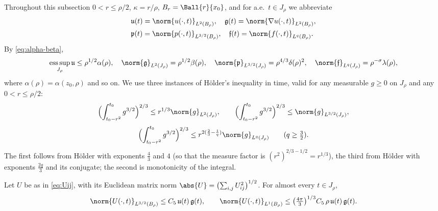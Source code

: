\documentclass[11pt,reqno]{amsart}
\begin{document}
Throughout this subsection $0<r\le\rho/2$, $\kappa=r/\rho$, $B_{r}=\Ball{r}{x_{0}}$,
and for a.e.\ $t\in J_{\rho}$ we abbreviate
\begin{equation}\label{eq:slice-norms}
\begin{aligned}
  &\mathfrak{u}(t)=\norm{u(\cdot,t)}_{L^{2}(B_{\rho})},\quad
  \mathfrak{g}(t)=\norm{\nabla u(\cdot,t)}_{L^{2}(B_{\rho})},\\
  &\mathfrak{p}(t)=\norm{p(\cdot,t)}_{L^{3/2}(B_{\rho})},\quad
  \mathfrak{f}(t)=\norm{f(\cdot,t)}_{L^{q}(B_{\rho})}.
\end{aligned}
\end{equation}
By \eqref{eq:alpha-beta},
\begin{equation}\label{eq:slice-norm-bounds}
  \operatorname*{ess\,sup}_{J_{\rho}}\mathfrak{u}\le\rho^{1/2}\alpha(\rho),
  \quad
  \norm{\mathfrak{g}}_{L^{2}(J_{\rho})}=\rho^{1/2}\beta(\rho),
  \quad
  \norm{\mathfrak{p}}_{L^{3/2}(J_{\rho})}=\rho^{4/3}\delta(\rho)^{2},
  \quad
  \norm{\mathfrak{f}}_{L^{q}(J_{\rho})}=\rho^{-\sigma}\lambda(\rho),
\end{equation}
where $\alpha(\rho)=\alpha(z_{0},\rho)$ and so on. We use three instances of
H\"older's inequality in time, valid for any measurable $g\ge0$ on $J_{\rho}$
and any $0<r\le\rho/2$:
\begin{equation}\label{eq:time-holder}
  \Bigl(\int_{t_{0}-r^{2}}^{t_{0}}g^{3/2}\Bigr)^{2/3}
  \le r^{1/3}\norm{g}_{L^{2}(J_{\rho})},
  \qquad
  \Bigl(\int_{t_{0}-r^{2}}^{t_{0}}g^{3/2}\Bigr)^{2/3}
  \le \norm{g}_{L^{3/2}(J_{\rho})},
\end{equation}
\begin{equation}\label{eq:time-holder-q}
  \Bigl(\int_{t_{0}-r^{2}}^{t_{0}}g^{3/2}\Bigr)^{2/3}
  \le r^{2(\frac23-\frac1q)}\norm{g}_{L^{q}(J_{\rho})}
  \qquad(q\ge\tfrac32).
\end{equation}
The first follows from H\"older with exponents $\tfrac43$ and $4$
(so that the measure factor is $(r^{2})^{2/3-1/2}=r^{1/3}$), the third from
H\"older with exponents $\tfrac{2q}{3}$ and its conjugate; the second is
monotonicity of the integral.

\begin{lemma}\label{lem:U-bounds}
Let $U$ be as in \eqref{eq:Uij}, with its Euclidean matrix norm
$\abs{U}=\bigl(\sum_{i,j}U_{ij}^{2}\bigr)^{1/2}$. For almost every $t\in J_{\rho}$,
\begin{equation}\label{eq:U-bounds}
  \norm{U(\cdot,t)}_{L^{3/2}(B_{\rho})}\le C_{5}\,\mathfrak{u}(t)\,\mathfrak{g}(t),
  \qquad
  \norm{U(\cdot,t)}_{L^{1}(B_{\rho})}
    \le\bigl(\tfrac{4\pi}{3}\bigr)^{1/3}C_{5}\,\rho\,\mathfrak{u}(t)\,\mathfrak{g}(t).
\end{equation}
\end{lemma}
\end{document}
